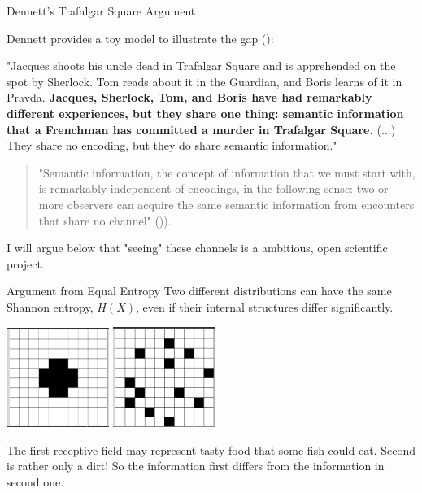 \documentclass[10pt, aspectratio=169]{beamer}
\begin{document}
\begin{frame}[label=trafalgar]{Dennett's Trafalgar Square Argument}
    
    Dennett provides a toy model to illustrate the gap (\cite{dennett_bacteria_2017}): 
    
    "Jacques shoots his uncle dead in Trafalgar Square and is apprehended on the spot by Sherlock. Tom reads about it in the Guardian, and Boris learns of it in Pravda.\textbf{ Jacques, Sherlock, Tom, and Boris have had remarkably different experiences, but they share one thing: semantic information that a Frenchman has committed a murder in Trafalgar Square.} (...) They share no encoding, but they do share semantic information."

    \bigskip
    
    \begin{quote}
    "Semantic information, the concept of information that we must start with, is remarkably independent of encodings, in the following sense: two or more observers can acquire the same semantic information from encounters that share no channel" ()\cite{dennett_bacteria_2017}). 
    \end{quote}

    I will argue below that "seeing" these channels is a ambitious, open scientific project.

\end{frame}






\begin{frame}[label=equal_entropy]{Argument from Equal Entropy}
  Two different distributions can have the same Shannon entropy, $H(X)$, even if their internal structures differ significantly. 

\begin{center}
    \includegraphics[width=0.25\textwidth]{images/entropia_1.png}
    \includegraphics[width=0.25\textwidth]{images/entropia_2.png}
\end{center}
   The first receptive field may represent tasty food that some  fish could eat. Second is rather only a dirt! So the information first differs from the information in second one.
\end{frame}
\end{document}

